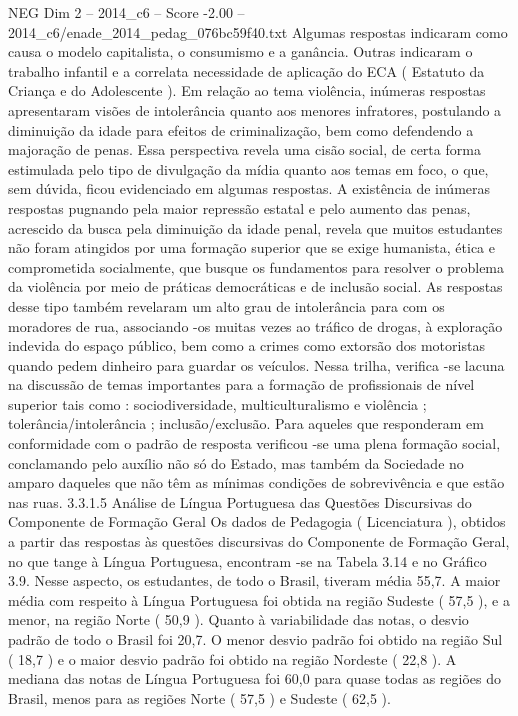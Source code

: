 \begin{textsample}{NEG Dim 2 – 2014\_c6 – Score -2.00 – 2014\_c6/enade\_2014\_pedag\_076bc59f40.txt}
Algumas respostas indicaram como causa o modelo capitalista, o consumismo e a ganância.
Outras indicaram o trabalho infantil e a correlata necessidade de aplicação do ECA ( Estatuto da Criança e do Adolescente ).
Em relação ao tema violência, inúmeras respostas apresentaram visões de intolerância quanto aos menores infratores, postulando a diminuição da idade para efeitos de criminalização, bem como defendendo a majoração de penas.
Essa perspectiva revela uma cisão social, de certa forma estimulada pelo tipo de divulgação da mídia quanto aos temas em foco, o que, sem dúvida, ficou evidenciado em algumas respostas.
A existência de inúmeras respostas pugnando pela maior repressão estatal e pelo aumento das penas, acrescido da busca pela diminuição da idade penal, revela que muitos estudantes não foram atingidos por uma formação superior que se exige humanista, ética e comprometida socialmente, que busque os fundamentos para resolver o problema da violência por meio de práticas democráticas e de inclusão social.
As respostas desse tipo também revelaram um alto grau de intolerância para com os moradores de rua, associando -os muitas vezes ao tráfico de drogas, à exploração indevida do espaço público, bem como a crimes como extorsão dos motoristas quando pedem dinheiro para guardar os veículos.
Nessa trilha, verifica -se lacuna na discussão de temas importantes para a formação de profissionais de nível superior tais como : sociodiversidade, multiculturalismo e violência ; tolerância/intolerância ; inclusão/exclusão.
Para aqueles que responderam em conformidade com o padrão de resposta verificou -se uma plena formação social, conclamando pelo auxílio não só do Estado, mas também da Sociedade no amparo daqueles que não têm as mínimas condições de sobrevivência e que estão nas ruas. 3.3.1.5 Análise de Língua Portuguesa das Questões Discursivas do Componente de Formação Geral Os dados de Pedagogia ( Licenciatura ), obtidos a partir das respostas às questões discursivas do Componente de Formação Geral, no que tange à Língua Portuguesa, encontram -se na Tabela 3.14 e no Gráfico 3.9.
Nesse aspecto, os estudantes, de todo o Brasil, tiveram média 55,7.
A maior média com respeito à Língua Portuguesa foi obtida na região Sudeste ( 57,5 ), e a menor, na região Norte ( 50,9 ).
Quanto à variabilidade das notas, o desvio padrão de todo o Brasil foi 20,7.
O menor desvio padrão foi obtido na região Sul ( 18,7 ) e o maior desvio padrão foi obtido na região Nordeste ( 22,8 ).
A mediana das notas de Língua Portuguesa foi 60,0 para quase todas as regiões do Brasil, menos para as regiões Norte ( 57,5 ) e Sudeste ( 62,5 ).

\end{textsample}

